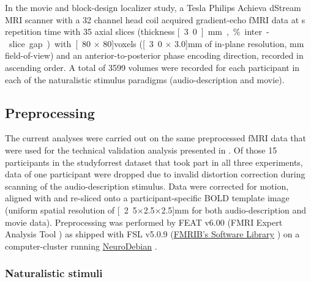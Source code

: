 In the movie and block-design localizer study, a \unit[3]{Tesla} Philips Achieva
dStream MRI scanner with a 32 channel head coil acquired gradient-echo fMRI data
at \unit[2]{s} repetition time with
35 axial slices (thickness \unit[3.0]{mm}, \unit[10]{\%} inter-slice gap) with
\unit[80 $\times$ 80]{voxels} (\unit[3.0 $\times$ 3.0]{mm} of in-plane
resolution, \unit[240]{mm} field-of-view) and an anterior-to-posterior phase
encoding direction, recorded in ascending order.
A total of 3599 volumes were recorded for each participant in each of the
naturalistic stimulus paradigms (audio-description and movie).




\subsection{Preprocessing}


The current analyses were carried out on the same preprocessed fMRI data
\citep{hanke2016aligned} that were used for the technical validation analysis
presented in \citet{hanke2016simultaneous}.
Of those 15 participants in the studyforrest dataset that took part in all three
experiments, data of one participant were dropped due to invalid distortion
correction during scanning of the audio-description stimulus.
Data were corrected for motion, aligned with and re-sliced onto a
participant-specific BOLD template image \citep{sengupta2016extension} (uniform
spatial resolution of \unit[2.5$\times$2.5$\times$2.5]{mm} for both
audio-description and movie data).
Preprocessing was performed by FEAT v6.00 (FMRI Expert Analysis Tool
\citep{woolrich2001autocorr}) as shipped with FSL v5.0.9
(\href{https://www.fmrib.ox.ac.uk/fsl}{FMRIB's Software Library}
\citep{smith2004fsl}) on a computer-cluster running
\href{http://neuro.debian.net}{NeuroDebian} \citep{halchenko2012open}.



\subsubsection{Naturalistic stimuli}



